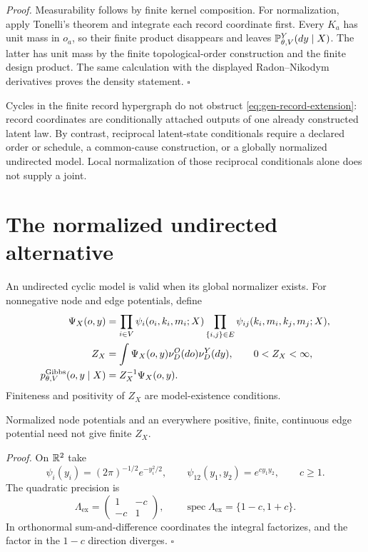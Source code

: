 \noindent\emph{Proof.}
Measurability follows by finite kernel composition. For normalization, apply Tonelli's theorem and
integrate each record coordinate first. Every $K_a$ has unit mass in $o_a$, so their finite product
disappears and leaves $\mathbb P_{\theta,V}^{Y}(dy\mid X)$. The latter has unit mass by the
finite topological-order construction and the finite design product. The same calculation with the
displayed Radon--Nikodym derivatives proves the density statement. \hfill$\square$

Cycles in the finite record hypergraph do not obstruct \eqref{eq:gen-record-extension}: record
coordinates are conditionally attached outputs of one already constructed latent law. By contrast,
reciprocal latent-state conditionals require a declared order or schedule, a common-cause
construction, or a globally normalized undirected model. Local normalization of those reciprocal
conditionals alone does not supply a joint.

\section{The normalized undirected alternative}
\label{sec:gen-undirected}

An undirected cyclic model is valid when its global normalizer exists.  For nonnegative node and
edge potentials, define
\begin{align}
\Psi_X(o,y)
&=\prod_{i\in V}\psi_i(o_i,k_i,m_i;X)
\prod_{\{i,j\}\in E}\psi_{ij}(k_i,m_i,k_j,m_j;X),
\label{eq:gen-gibbs-potential}\\
Z_X
&=\int\Psi_X(o,y)\nu_D^O(do)\nu_D^Y(dy),
\qquad 0<Z_X<\infty,
\label{eq:gen-gibbs-partition}\\
p_{\theta,V}^{\mathrm{Gibbs}}(o,y\mid X)
&=Z_X^{-1}\Psi_X(o,y).
\label{eq:gen-gibbs-density}
\end{align}
Finiteness and positivity of $Z_X$ are model-existence conditions. 

Normalized node potentials and an everywhere positive, finite, continuous edge potential need not
give finite $Z_X$. 

\noindent\emph{Proof.}
On $\mathbb R^2$ take
\begin{equation}
\psi_i(y_i)=(2\pi)^{-1/2}e^{-y_i^2/2},
\qquad
\psi_{12}(y_1,y_2)=e^{cy_1y_2},
\qquad c\geq1.
\label{eq:gen-gibbs-counterexample}
\end{equation}
The quadratic precision is
\begin{equation}
\Lambda_{\mathrm{ex}}=\begin{pmatrix}1&-c\\-c&1\end{pmatrix},
\qquad
\operatorname{spec}\Lambda_{\mathrm{ex}}=\{1-c,1+c\}.
\label{eq:gen-gibbs-counterexample-matrix}
\end{equation}
In orthonormal sum-and-difference coordinates the integral factorizes, and the factor in the
$1-c$ direction diverges. \hfill$\square$

